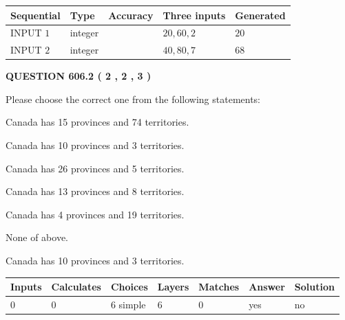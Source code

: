 \documentclass[12pt]{article}
\begin{document}
  
\noindent\begin{tabular}{|l|l|l|l|l|}
\hline
 Sequential & Type & Accuracy & Three inputs & Generated \\ 
\hline
 
 
  INPUT $  1 $ & integer &  & $
 20
 , 
 60
 , 
 2
 $ & $ 20 $ 
 \\  \hline  
 
 
  INPUT $  2 $ & integer &  & $
 40
 , 
 80
 , 
 7
 $ & $ 68 $ 
 \\  \hline  
 \end{tabular}
   
   
  
\vspace{0.2in}
  
{\textbf{\Large{QUESTION
606.2 
 ( 2 , 2 , 3 )
}}}
  
  
Please choose the correct one from the following statements:
 
 
Canada has  15 provinces and  74 territories.
 
 
Canada has 10  provinces and 3 territories.
 
 
Canada has  26 provinces and  5 territories.
 
 
Canada has  13 provinces and  8 territories.
 
 
Canada has   4 provinces and  19 territories.
 
 
 None of above.
 
 
\noindent{}
 
 
Canada has 10  provinces and 3 territories.
 
 
\noindent{}
 
 
   
   
   
   
\noindent\begin{tabular}{|l|l|l|l|l|l|l|}
 \hline
Inputs & Calculates & Choices & Layers & Matches & Answer & Solution \\ \hline
 0  & 
 0  & 
 6
  simple  
  & 
 6  & 
 0  & 
  yes & 
  no 
  \\ \hline
 \end{tabular}
   
\end{document}
